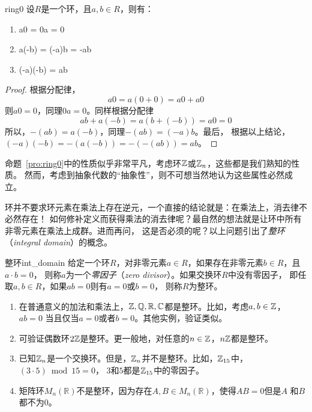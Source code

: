 \begin{proposition}{}{ring0}
设$R$是一个环，且$a, b \in R$，则有：
\begin{enumerate}
\item a0 = 0a = 0
\item a(-b) =  (-a)b = -ab
\item(-a)(-b) = ab
\end{enumerate}
\end{proposition}

\begin{proof}
根据分配律，
\[ a 0 = a  (0 + 0) = a0 + a0\]
则$a0 = 0$，同理$0a = 0$。同样根据分配律
\[ab + a(-b) = a(b + (-b)) = a 0 = 0\]
所以，$-(ab) = a(-b)$，同理$-(ab) = (-a)b$。最后，
根据以上结论，
$(-a)(-b) = -(a(-b)) = -(-(ab)) = ab$。
\end{proof}

\begin{remark}
命题~\ref{pro:ring0}中的性质似乎非常平凡，考虑环${\mathbb Z}$或${\mathbb Z}_n$，这些都是我们熟知的性质。
然而，考虑到抽象代数的“抽象性”，则不可想当然地认为这些属性必然成立。
\end{remark}

环并不要求环元素在乘法上存在逆元，一个直接的结论就是：在乘法上，消去律不必然存在！
如何修补定义而获得乘法的消去律呢？最自然的想法就是让环中所有非零元素在乘法上成群。进而再问，
这是否必须的呢？以上问题引出了\emph{整环}（\emph{integral domain}）的概念。
\begin{definition}{整环}{int_domain}
给定一个环$R$，对非零元素$a \in R$，如果存在非零元素$b\in R$，且$a \cdot b = 0$，
则称$a$为一个\emph{零因子}（\emph{zero divisor}）。如果交换环$R$中没有零因子，
即任取$a, b \in R$，如果$ab = 0$则有$a = 0$或$b = 0$， 
则称$R$为整环。
\end{definition}

\begin{example}
\begin{enumerate}
\item 在普通意义的加法和乘法上，${\mathbb Z}, \mathbb{Q}, \mathbb{R}, \mathbb{C}$都是整环。比如，考虑$a, b \in {\mathbb Z}$，
$ab = 0$ 当且仅当$a=0$或者$b = 0$。其他实例，验证类似。

\item 可验证偶数环$2{\mathbb Z}$是整环。更一般地，对任意的$n\in {\mathbb Z}$，$n{\mathbb Z}$都是整环。

\item 已知${\mathbb Z}_n$是一个交换环。但是，${\mathbb Z}_n$并不是整环。比如，${\mathbb Z}_{15}$中，$(3 \cdot 5) \bmod 15 = 0$，
$3$和$5$都是${\mathbb Z}_{15}$中的零因子。

\item 矩阵环$M_n(\mathbb{R})$不是整环，因为存在$A, B \in M_n(\mathbb{R})$，使得$AB = 0$但是$A$
和$B$都不为$0$。
\end{enumerate}
\end{example}

